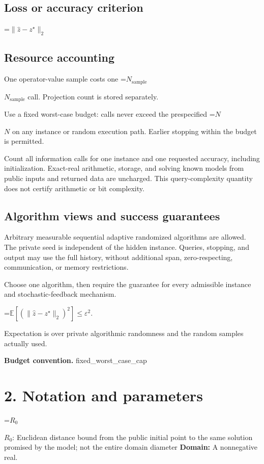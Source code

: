 \documentclass[10pt,a4paper]{article}
\newcommand{\AtlasMath}[1]{\par\begingroup\centering\setbox0=\hbox{$\displaystyle #1$}\ifdim\wd0>1.4\linewidth\typeout{ATLAS WIDE FORMULA: \the\wd0}\fi\ifdim\wd0>\linewidth\resizebox{\linewidth}{!}{\box0}\else\box0\fi\par\endgroup}
\newcommand{\AtlasInlineMath}[1]{\begingroup\setbox0=\hbox{$#1$}\ifdim\wd0>.4\linewidth\endgroup\AtlasMath{#1}\else\endgroup$#1$\fi}
\begin{document}
\subsection{Loss or accuracy criterion}

\AtlasMath{\|\widehat{z}-z^\star\|_2}


\subsection{Resource accounting}
One operator-value sample costs one \AtlasInlineMath{N_{\mathrm{sample}}} call. Projection count is stored separately.

Use a fixed worst-case budget: calls never exceed the prespecified \AtlasInlineMath{N} on any instance or random execution path. Earlier stopping within the budget is permitted.

Count all information calls for one instance and one requested accuracy, including initialization. Exact-real arithmetic, storage, and solving known models from public inputs and returned data are uncharged. This query-complexity quantity does not certify arithmetic or bit complexity.

\subsection{Algorithm views and success guarantees}
Arbitrary measurable sequential adaptive randomized algorithms are allowed. The private seed is independent of the hidden instance. Queries, stopping, and output may use the full history, without additional span, zero-respecting, communication, or memory restrictions.

Choose one algorithm, then require the guarantee for every admissible instance and stochastic-feedback mechanism.


\AtlasMath{\mathbb{E}\!\left[\left(\|\widehat{z}-z^\star\|_2\right)^2\right]\le\varepsilon^2.}


Expectation is over private algorithmic randomness and the random samples actually used.

\textbf{Budget convention.} fixed\_worst\_case\_cap

\section{2. Notation and parameters}
\AtlasInlineMath{R_0}: Euclidean distance bound from the public initial point to the same solution promised by the model; not the entire domain diameter \textbf{Domain:} A nonnegative real.
\end{document}
